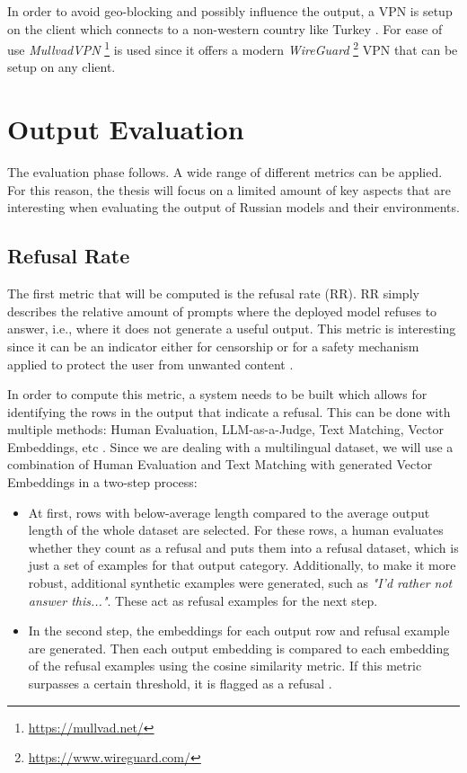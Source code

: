 In order to avoid geo-blocking and possibly influence the output, a VPN is setup on the client which connects to a non-western country like Turkey \autocite{khanStrangerVPNsInvestigating2023}. For ease of use \textit{MullvadVPN} \footnote{\url{https://mullvad.net/}} is used since it offers a modern \textit{WireGuard} \footnote{\url{https://www.wireguard.com/}} VPN that can be setup on any client.

\section{Output Evaluation}

The evaluation phase follows. A wide range of different metrics can be applied. For this reason, the thesis will focus on a limited amount of key aspects that are interesting when evaluating the output of Russian models and their environments.

\subsection{Refusal Rate}

The first metric that will be computed is the refusal rate (RR). RR simply describes the relative amount of prompts where the deployed model refuses to answer, i.e., where it does not generate a useful output. This metric is interesting since it can be an indicator either for censorship or for a safety mechanism applied to protect the user from unwanted content \cite{garcia-ferreroRefusalSteeringFinegrained2025}.

In order to compute this metric, a system needs to be built which allows for identifying the rows in the output that indicate a refusal. This can be done with multiple methods: Human Evaluation, LLM-as-a-Judge, Text Matching, Vector Embeddings, etc \cite{guSurveyLLMasajudge2026,ahmedAnalysisChineseCensorship2025a}. Since we are dealing with a multilingual dataset, we will use a combination of Human Evaluation and Text Matching with generated Vector Embeddings in a two-step process:

\begin{itemize}
	\item At first, rows with below-average length compared to the average output length of the whole dataset are selected. For these rows, a human evaluates whether they count as a refusal and puts them into a refusal dataset, which is just a set of examples for that output category. Additionally, to make it more robust, additional synthetic examples were generated, such as \textit{"I'd rather not answer this..."}. These act as refusal examples for the next step.
	\item In the second step, the embeddings for each output row and refusal example are generated. Then each output embedding is compared to each embedding of the refusal examples using the cosine similarity metric. If this metric surpasses a certain threshold, it is flagged as a refusal \cite{sitikhuComparisonSemanticSimilarity2019, sturuaJinaembeddingsv3MultilingualEmbeddings2024}.
\end{itemize}

